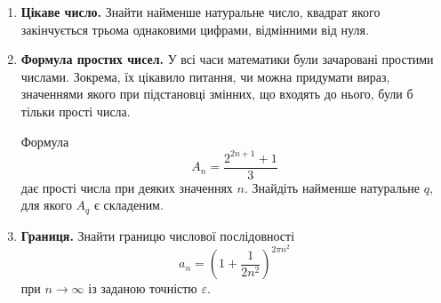 
\begin{enumerate}
\item \textbf{Цікаве число.} Знайти найменше натуральне число, квадрат якого закінчується трьома однаковими цифрами, відмінними від нуля.
\item \textbf{Формула простих чисел.} У всі часи математики були зачаровані простими числами. Зокрема, їх цікавило питання, чи можна придумати вираз, значеннями якого при підстановці змінних, що входять до нього, були б тільки прості числа.

Формула
$$A_n=\dfrac{2^{2n+1}+1}{3}$$
дає прості числа при деяких значеннях $n$. Знайдіть найменше натуральне $q$, для якого $A_q$ є складеним.
\item \textbf{Границя.} Знайти границю числової послідовності
$$
a_n=\left(1+\frac{1}{2n^2}\right)^{2\pi n^2}
$$
при $n\to\infty$ із заданою точністю $\varepsilon$.

\end{enumerate}




